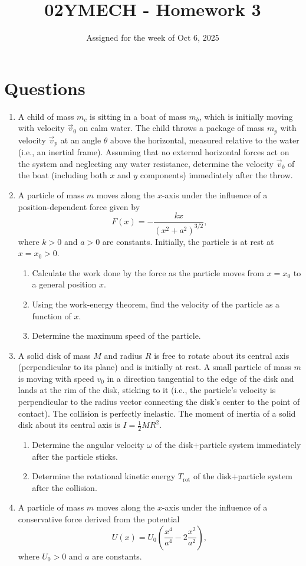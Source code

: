 \documentclass[12pt]{article}
\title{02YMECH - Homework 3}
\date{Assigned for the week of Oct 6, 2025}
\author{}
\begin{document}
\maketitle

\section*{Questions}

\begin{enumerate}
    \item A child of mass $m_c$ is sitting in a boat of mass $m_b$, which is initially moving with velocity $\vec{v}_0$ on calm water. The child throws a package of mass $m_p$ with velocity $\vec{v}_p$ at an angle $\theta$ above the horizontal, measured relative to the water (i.e., an inertial frame). Assuming that no external horizontal forces act on the system and neglecting any water resistance, determine the velocity $\vec{v}_b$ of the boat (including both $x$ and $y$ components) immediately after the throw.
    \item A particle of mass $m$ moves along the $x$-axis under the influence of a position-dependent force given by
\[
F(x) = - \frac{k x}{(x^2 + a^2)^{3/2}},
\]
where $k>0$ and $a>0$ are constants. Initially, the particle is at rest at $x = x_0 > 0$. 

\begin{enumerate}
    \item Calculate the work done by the force as the particle moves from $x = x_0$ to a general position $x$. 
    \item Using the work-energy theorem, find the velocity of the particle as a function of $x$. 
    \item Determine the maximum speed of the particle. 
\end{enumerate}
    \item A solid disk of mass $M$ and radius $R$ is free to rotate about its central axis (perpendicular to its plane) and is initially at rest. A small particle of mass $m$ is moving with speed $v_0$ in a direction tangential to the edge of the disk and lands at the rim of the disk, sticking to it (i.e., the particle’s velocity is perpendicular to the radius vector connecting the disk’s center to the point of contact). The collision is perfectly inelastic. The moment of inertia of a solid disk about its central axis is $I = \frac{1}{2} M R^2$.
    \begin{enumerate}
        \item Determine the angular velocity $\omega$ of the disk+particle system immediately after the particle sticks.
        \item Determine the rotational kinetic energy $T_\text{rot}$ of the disk+particle system after the collision.
    \end{enumerate}
    \item A particle of mass $m$ moves along the $x$-axis under the influence of a conservative force derived from the potential
\[
U(x) = U_0 \left( \frac{x^4}{a^4} - 2 \frac{x^2}{a^2} \right),
\]
where $U_0 > 0$ and $a$ are constants.


\end{enumerate}
\end{document}
